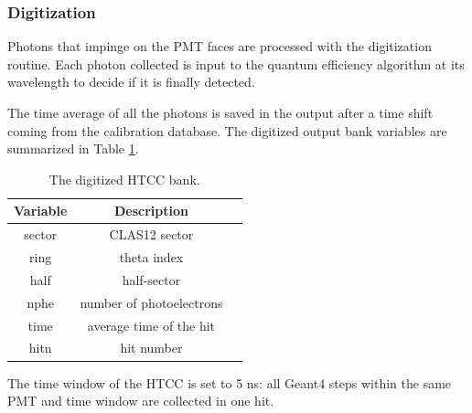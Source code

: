 \subsubsection{Digitization}
Photons that impinge on the PMT faces are processed with the digitization routine.
Each photon collected is input to the quantum efficiency algorithm at its wavelength to decide if it is finally detected.

The time average of all the photons is saved in the output after a time shift coming from the calibration database.
The digitized output bank variables are summarized in Table \ref{tab:htccBank}.

\begin{table}[h]
	\begin{center}
		\begin{tabular}{| c | c | c |}
			\hline \hline
			Variable  & Description                         \\
			\hline
             sector   &                   CLAS12 sector     \\
             ring     &                     theta index     \\
             half     &                     half-sector     \\
             nphe     &        number of photoelectrons     \\
             time     &         average time of the hit     \\
             hitn     &                      hit number     \\
			\hline \hline
		\end{tabular}
	\end{center}
	\caption{The digitized HTCC bank.}\label{tab:htccBank}
\end{table}

The time window  of the HTCC is set to 5 ns: all Geant4 steps within the same PMT and time window are collected in one hit.
